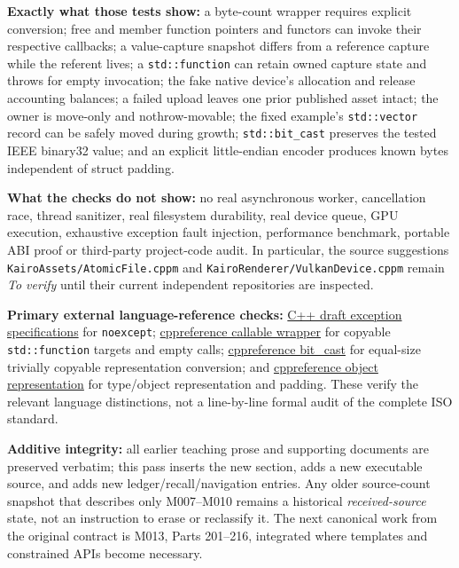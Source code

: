 \textbf{Exactly what those tests show:} a byte-count wrapper requires explicit conversion; free and member function pointers and functors can invoke their respective callbacks; a value-capture snapshot differs from a reference capture while the referent lives; a \texttt{std::function} can retain owned capture state and throws for empty invocation; the fake native device's allocation and release accounting balances; a failed upload leaves one prior published asset intact; the owner is move-only and nothrow-movable; the fixed example's \texttt{std::vector} record can be safely moved during growth; \texttt{std::bit\_cast} preserves the tested IEEE binary32 value; and an explicit little-endian encoder produces known bytes independent of struct padding.

\textbf{What the checks do not show:} no real asynchronous worker, cancellation race, thread sanitizer, real filesystem durability, real device queue, GPU execution, exhaustive exception fault injection, performance benchmark, portable ABI proof or third-party project-code audit. In particular, the source suggestions \texttt{KairoAssets/AtomicFile.cppm} and \texttt{KairoRenderer/VulkanDevice.cppm} remain \emph{To verify} until their current independent repositories are inspected.

\textbf{Primary external language-reference checks:} \href{https://eel.is/c++draft/except.spec}{C++ draft exception specifications} for \texttt{noexcept}; \href{https://en.cppreference.com/w/cpp/utility/functional/function}{cppreference callable wrapper} for copyable \texttt{std::function} targets and empty calls; \href{https://en.cppreference.com/w/cpp/numeric/bit_cast}{cppreference bit\_cast} for equal-size trivially copyable representation conversion; and \href{https://en.cppreference.com/w/cpp/language/object}{cppreference object representation} for type/object representation and padding. These verify the relevant language distinctions, not a line-by-line formal audit of the complete ISO standard.

\textbf{Additive integrity:} all earlier teaching prose and supporting documents are preserved verbatim; this pass inserts the new section, adds a new executable source, and adds new ledger/recall/navigation entries. Any older source-count snapshot that describes only M007--M010 remains a historical \emph{received-source} state, not an instruction to erase or reclassify it. The next canonical work from the original contract is M013, Parts 201--216, integrated where templates and constrained APIs become necessary.


